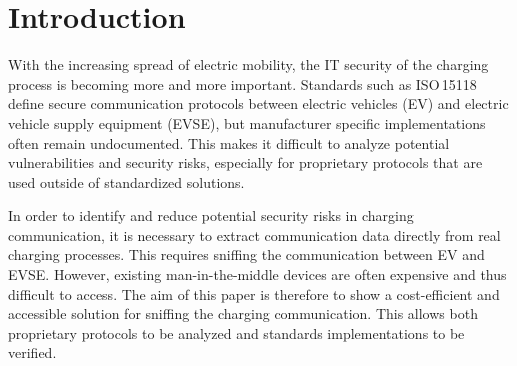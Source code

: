 \documentclass[sigconf]{acmart}
\begin{document}

\maketitle

\section{Introduction}
With the increasing spread of electric mobility, the IT security of the charging process is becoming more and more important. Standards such as ISO\,15118 define secure communication protocols between electric vehicles (EV) and electric vehicle supply equipment (EVSE), but manufacturer specific implementations often remain undocumented. This makes it difficult to analyze potential vulnerabilities and security risks, especially for proprietary protocols that are used outside of standardized solutions.

In order to identify and reduce potential security risks in charging communication, it is necessary to extract communication data directly from real charging processes. This requires sniffing the communication between EV and EVSE. However, existing man-in-the-middle devices are often expensive and thus difficult to access. The aim of this paper is therefore to show a cost-efficient and accessible solution for sniffing the charging communication. This allows both proprietary protocols to be analyzed and standards implementations to be verified.
\end{document}
